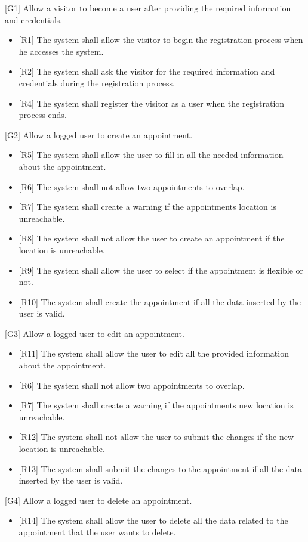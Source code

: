 \documentclass[12pt]{article}
\begin{document}
{[G1]} Allow a visitor to become a user after providing the required information and credentials.
\begin{itemize}
    \item{[R1]} The system shall allow the visitor to begin the registration process when he accesses the system. 
    \item{[R2]} The system shall ask the visitor for the required information and credentials during the registration process.
    \item{[R4]} The system shall register the visitor as a user when the registration process ends.
\end{itemize}
{[G2]} Allow a logged user to create an appointment.
\begin{itemize}
    \item{[R5]} The system shall allow the user to fill in all the needed information about the appointment.
    \item{[R6]} The system shall not allow two appointments to overlap.
    \item{[R7]} The system shall create a warning if the appointments location is unreachable.
    \item{[R8]} The system shall not allow the user to create an appointment if the location is unreachable.
    \item{[R9]} The system shall allow the user to select if the appointment is flexible or not.
    \item{[R10]} The system shall create the appointment if all the data inserted by the user is valid.
\end{itemize}
{[G3]} Allow a logged user to edit an appointment.
\begin{itemize}
    \item{[R11]} The system shall allow the user to edit all the provided information about the appointment.
    \item{[R6]} The system shall not allow two appointments to overlap.
    \item{[R7]} The system shall create a warning if the appointments new location is unreachable.
    \item{[R12]} The system shall not allow the user to submit the changes if the new location is unreachable.
    \item{[R13]} The system shall submit the changes to the appointment if all the data inserted by the user is valid.
\end{itemize}
{[G4]} Allow a logged user to delete an appointment.
\begin{itemize}
    \item{[R14]} The system shall allow the user to delete all the data related to the appointment that the user wants to delete.
\end{itemize}
\end{document}
